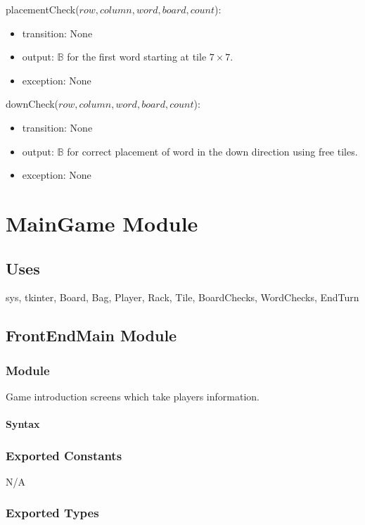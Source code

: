\documentclass[12pt]{article}
\begin{document}
\noindent placementCheck($row, column, word, board, count$):
\begin{itemize}
\item transition: None
\item output: $\mathbb{B}$ for the first word starting at tile $7\times7$.
\item exception: None
\end{itemize}

\noindent downCheck($row, column, word, board, count$):
\begin{itemize}
\item transition: None
\item output: $\mathbb{B}$ for correct placement of word in the down direction using free tiles.
\item exception: None
\end{itemize}

\newpage

\section* {MainGame Module}

\subsection*{Uses}

sys, tkinter, Board, Bag, Player, Rack, Tile, BoardChecks, WordChecks, EndTurn

\subsection*{FrontEndMain Module}

\subsubsection*{Module}

Game introduction screens which take players information.

\paragraph*{Syntax}

\subsubsection*{Exported Constants}
N/A
\subsubsection*{Exported Types}
\end{document}
